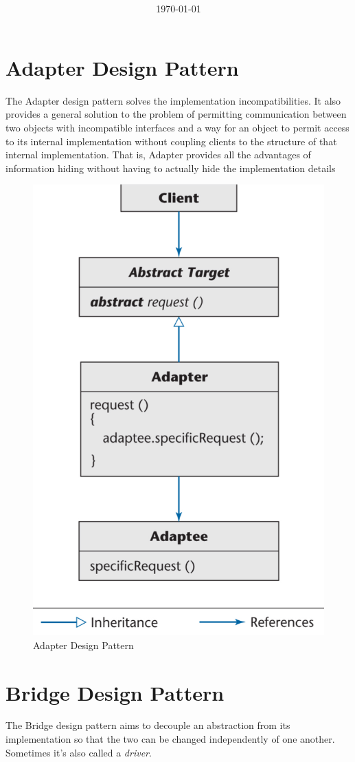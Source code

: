 \documentclass[11pt]{article}
\title{\textbf{\Topic}}
\author{\Name}
\date{\today}
\begin{document}
\maketitle
\noindent\makebox[\linewidth]{\rule[8pt]{5in}{0.5pt}}

\section*{Adapter Design Pattern}

The Adapter design pattern solves the implementation incompatibilities. It also provides a general solution to the problem of permitting communication between two objects with incompatible interfaces and a way for an object to permit access to its internal implementation without coupling clients to the structure of that internal implementation. That is, Adapter provides all the advantages of information hiding without having to actually hide the implementation details

\begin{figure}[h]
	\centering
	\includegraphics[width=0.5\linewidth]{images/AdapterPattern.png}
	\caption{Adapter Design Pattern}
	\label{fig:AdapterPattern}
\end{figure}

\section*{Bridge Design Pattern}

The Bridge design pattern aims to decouple an abstraction from its implementation so that the two can be changed independently of one another. Sometimes it's also called a \textit{driver}.
\end{document}
